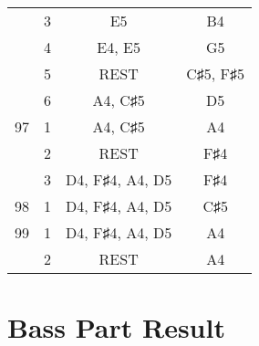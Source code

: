 \documentclass{article}
\begin{document}
\begin{longtable}{|c|c|c|c|}
  & 3 & E5 & B4 \\ 
  & 4 & E4, E5 & G5 \\ 
  & 5 & REST & C♯5, F♯5 \\ 
  & 6 & A4, C♯5 & D5 \\ 
\hline
97 & 1 & A4, C♯5 & A4 \\ 
  & 2 & REST & F♯4 \\ 
  & 3 & D4, F♯4, A4, D5 & F♯4 \\ 
\hline
98 & 1 & D4, F♯4, A4, D5 & C♯5 \\ 
\hline
99 & 1 & D4, F♯4, A4, D5 & A4 \\ 
  & 2 & REST & A4 \\ 
\hline
\end{longtable}
\section*{Bass Part Result}
\end{document}
